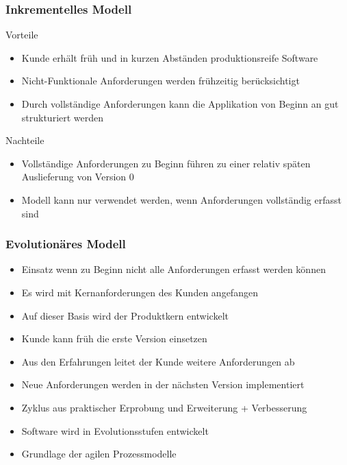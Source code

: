 \begin{frame}
\frametitle{Inkrementelles Modell}
	Vorteile
	\begin{itemize}
		\item Kunde erhält früh und in kurzen Abständen produktionsreife Software
		\item Nicht-Funktionale Anforderungen werden frühzeitig berücksichtigt
		\item Durch vollständige Anforderungen kann die Applikation von
		Beginn an gut strukturiert werden
	\end{itemize}
	\bigskip
	Nachteile
	\begin{itemize}
		\item Vollständige Anforderungen zu Beginn führen zu einer relativ späten
		Auslieferung von Version 0
		\item Modell kann nur verwendet werden, wenn Anforderungen vollständig erfasst
		sind
	\end{itemize}
\end{frame}

\begin{frame}
\frametitle{Evolutionäres Modell}
	\begin{itemize}
		\item Einsatz wenn zu Beginn nicht alle Anforderungen erfasst werden können
		\item Es wird mit Kernanforderungen des Kunden angefangen
		\item Auf dieser Basis wird der Produktkern entwickelt
		\item Kunde kann früh die erste Version einsetzen
		\item Aus den Erfahrungen leitet der Kunde weitere Anforderungen ab
		\item Neue Anforderungen werden in der nächsten Version implementiert
		\item Zyklus aus praktischer Erprobung und Erweiterung + Verbesserung
		\item Software wird in Evolutionsstufen entwickelt
		\item Grundlage der agilen Prozessmodelle
	\end{itemize}
\end{frame}

